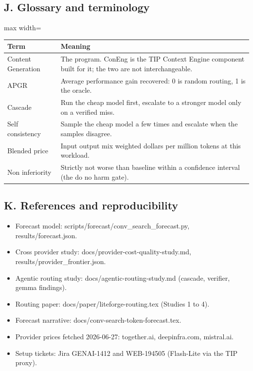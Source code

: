 \documentclass[11pt]{uce-report}
\begin{document}
\subsection{J. Glossary and terminology}
\vspace{0.4em}
\noindent\begin{adjustbox}{max width=\linewidth}\begin{tabular}{lp{10cm}}
\toprule
\textbf{Term} & \textbf{Meaning} \\
\midrule
Content Generation & The program. ConEng is the TIP Context Engine component built for it; the two are not interchangeable. \\
APGR & Average performance gain recovered: 0 is random routing, 1 is the oracle. \\
Cascade & Run the cheap model first, escalate to a stronger model only on a verified miss. \\
Self consistency & Sample the cheap model a few times and escalate when the samples disagree. \\
Blended price & Input output mix weighted dollars per million tokens at this workload. \\
Non inferiority & Strictly not worse than baseline within a confidence interval (the do no harm gate). \\
\bottomrule
\end{tabular}\end{adjustbox}

\subsection{K. References and reproducibility}
\begin{itemize}
  \item Forecast model: scripts/forecast/conv\_search\_forecast.py, results/forecast.json.  \item Cross provider study: docs/provider-cost-quality-study.md, results/provider\_frontier.json.  \item Agentic routing study: docs/agentic-routing-study.md (cascade, verifier, gemma findings).  \item Routing paper: docs/paper/liteforge-routing.tex (Studies 1 to 4).  \item Forecast narrative: docs/conv-search-token-forecast.tex.  \item Provider prices fetched 2026-06-27: together.ai, deepinfra.com, mistral.ai.  \item Setup tickets: Jira GENAI-1412 and WEB-194505 (Flash-Lite via the TIP proxy).\end{itemize}
\end{document}
